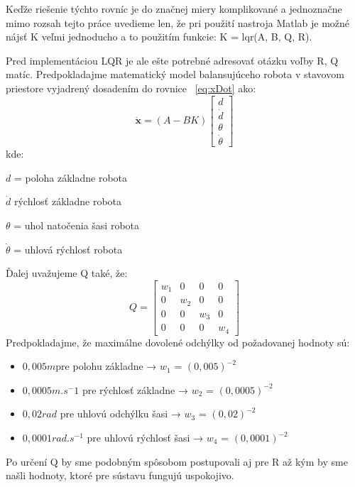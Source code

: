 Keďže riešenie týchto rovníc je do značnej miery komplikované a jednoznačne mimo rozsah tejto práce uvedieme len, že pri použití nastroja Matlab je možné nájsť K veľmi jednoducho a to použitím funkcie: K = lqr(A, B, Q, R).

Pred implementáciou LQR je ale ešte potrebné adresovať otázku voľby R, Q matíc. Predpokladajme matematický model balansujúceho robota v stavovom priestore vyjadrený dosadením do rovnice \figurename~\ref{eq:xDot} ako:
\begin{equation}
\dot {\textbf {x}} = (A - BK) \begin{bmatrix}
d \\
\dot{d} \\
\theta \\
\dot{\theta} 
\end{bmatrix}
\end{equation}
kde: 

\quad $d$ = poloha základne robota 

\quad $\dot{d}$ rýchlosť  základne robota 

\quad $\theta$ = uhol natočenia šasi robota 

\quad $\dot{\theta}$ = uhlová rýchlosť robota

Ďalej uvažujeme Q také, že:
\begin{equation}
Q = \begin{bmatrix}
w_1 & 0 & 0 & 0 \\
0 & w_2 & 0 & 0 \\
0 & 0 & w_3 & 0 \\
0 & 0 & 0 & w_4
\end{bmatrix}
\end{equation}
\newline
Predpokladajme, že maximálne dovolené odchýlky od požadovanej hodnoty sú:
\begin{itemize}
\item $0,005 m $pre polohu základne → $w_1$ = $(0,005)^{-2}$
\item $0,0005 m.s^-1$ pre rýchlosť základne → $w_2$ = $(0,0005)^{-2}$
\item $0,02 rad$ pre uhlovú odchýlku šasi → $w_3$ = $(0,02)^{-2}$
\item $0,0001 rad.s^{-1}$ pre uhlovú rýchlosť šasi → $w_4$ = $(0,0001)^{-2}$
\end{itemize}

Po určení Q by sme podobným spôsobom postupovali aj pre R až kým by sme našli hodnoty, ktoré pre sústavu fungujú uspokojivo. 


